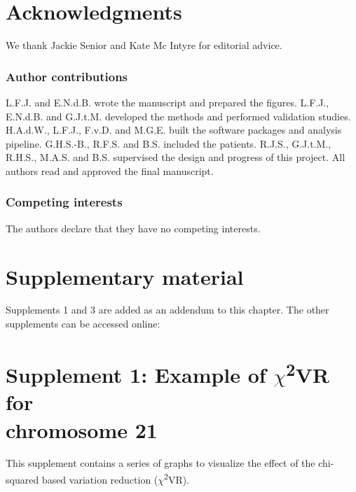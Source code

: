 \section*{Acknowledgments}\label{Acknowledgments} 
We thank Jackie Senior and Kate Mc Intyre for editorial advice.

\subsubsection{Author contributions}
L.F.J. and E.N.d.B. wrote the manuscript and prepared the figures. L.F.J., E.N.d.B. and G.J.t.M. developed the methods and performed validation studies. H.A.d.W., L.F.J., F.v.D. and M.G.E. built the software packages and analysis pipeline. G.H.S.-B., R.F.S. and B.S. included the patients. R.J.S., G.J.t.M., R.H.S., M.A.S. and B.S. supervised the design and progress of this project. All authors read and approved the final manuscript.

\subsubsection{Competing interests}
The authors declare that they have no competing interests.

\section*{Supplementary material}\label{Supplementary material}
Supplements 1 and 3 are added as an addendum to this chapter. 
The other supplements can be accessed online: 


\newpage
{}
\section[Supplement 1: $\chi$\textsuperscript{2}VR for chromosome 21]{Supplement 1: Example of $\chi$\textsuperscript{2}VR for \\ chromosome 21}\label{Supplement 1}

This supplement contains a series of graphs to visualize the effect of the chi-squared based variation reduction ($\chi$\textsuperscript{2}VR). 


